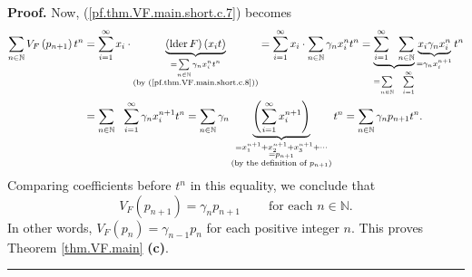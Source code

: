 \documentclass[numbers=enddot,12pt,final,onecolumn,notitlepage]{scrartcl}%
\theoremstyle{definition}
\newenvironment{proof}[1][Proof]{\noindent\textbf{#1.} }{\ \rule{0.5em}{0.5em}}
\let\sumnonlimits\sum
\renewcommand{\sum}{\sumnonlimits\limits}
\newenvironment{vershort}{}{}
\begin{document}
\begin{vershort}
\begin{proof}
Now, (\ref{pf.thm.VF.main.short.c.7}) becomes%
\begin{align*}
\sum_{n\in\mathbb{N}}V_{F}\left(  p_{n+1}\right)  t^{n}  &  =\sum
_{i=1}^{\infty}x_{i}\cdot\underbrace{\left(  \operatorname*{lder}F\right)
\left(  x_{i}t\right)  }_{\substack{=\sum_{n\in\mathbb{N}}\gamma_{n}x_{i}%
^{n}t^{n}\\\text{(by (\ref{pf.thm.VF.main.short.c.8}))}}}=\sum_{i=1}^{\infty
}x_{i}\cdot\sum_{n\in\mathbb{N}}\gamma_{n}x_{i}^{n}t^{n}=\underbrace{\sum
_{i=1}^{\infty}\ \ \sum_{n\in\mathbb{N}}}_{=\sum_{n\in\mathbb{N}}%
\ \ \sum_{i=1}^{\infty}}\underbrace{x_{i}\gamma_{n}x_{i}^{n}}_{=\gamma
_{n}x_{i}^{n+1}}t^{n}\\
&  =\sum_{n\in\mathbb{N}}\ \ \sum_{i=1}^{\infty}\gamma_{n}x_{i}^{n+1}%
t^{n}=\sum_{n\in\mathbb{N}}\gamma_{n}\underbrace{\left(  \sum_{i=1}^{\infty
}x_{i}^{n+1}\right)  }_{\substack{=x_{1}^{n+1}+x_{2}^{n+1}+x_{3}^{n+1}%
+\cdots\\=p_{n+1}\\\text{(by the definition of }p_{n+1}\text{)}}}t^{n}%
=\sum_{n\in\mathbb{N}}\gamma_{n}p_{n+1}t^{n}.
\end{align*}
Comparing coefficients before $t^{n}$ in this equality, we conclude that%
\[
V_{F}\left(  p_{n+1}\right)  =\gamma_{n}p_{n+1}\ \ \ \ \ \ \ \ \ \ \text{for
each }n\in\mathbb{N}.
\]
In other words, $V_{F}\left(  p_{n}\right)  =\gamma_{n-1}p_{n}$ for each
positive integer $n$. This proves Theorem \ref{thm.VF.main} \textbf{(c)}.
\end{proof}
\end{vershort}
\end{document}
